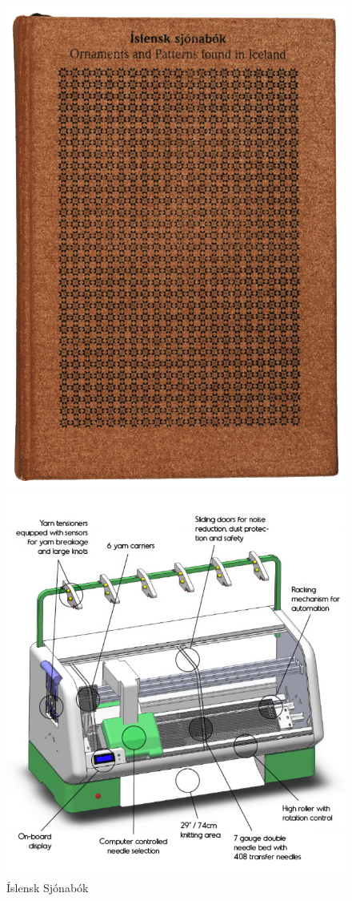 \documentclass[a4paper,12pt,twoside]{article}
\begin{document}
\begin{figure}[H]
    \centering
    \begin{minipage}[b]{0.45\linewidth}
        \centering
        \includegraphics[width=.8\linewidth]{myndir/sjónabók.png}
        \caption{Íslensk Sjónabók}
        \label{fig:sjonabok}
    \end{minipage}
    \hspace{0.05\linewidth} %
    \begin{minipage}[b]{0.45\linewidth}
        \centering
        \includegraphics[width=\linewidth]{myndir/skema-kniterate.png}

\end{minipage}
\end{figure}
\end{document}
